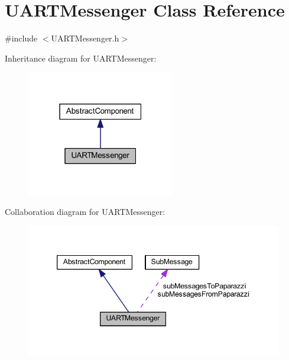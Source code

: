 \hypertarget{class_u_a_r_t_messenger}{}\section{U\+A\+R\+T\+Messenger Class Reference}
\label{class_u_a_r_t_messenger}


{\ttfamily \#include $<$U\+A\+R\+T\+Messenger.\+h$>$}



Inheritance diagram for U\+A\+R\+T\+Messenger\+:\nopagebreak
\begin{figure}[H]
\begin{center}
\leavevmode
\includegraphics[width=183pt]{class_u_a_r_t_messenger__inherit__graph}
\end{center}
\end{figure}


Collaboration diagram for U\+A\+R\+T\+Messenger\+:\nopagebreak
\begin{figure}[H]
\begin{center}
\leavevmode
\includegraphics[width=346pt]{class_u_a_r_t_messenger__coll__graph}
\end{center}
\end{figure}
